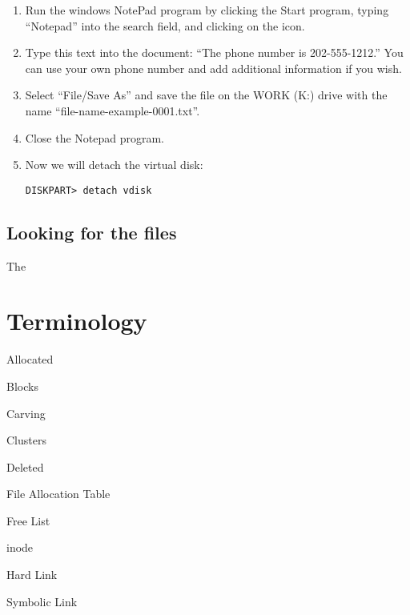 \begin{enumerate}
At this point we have a 16MB virtual disk attached to the computer as
drive K:. The drive's contents are stored in the file |C:\disk1.vhd|.

Lastly, we want to put a file on this disk. For test purposes we are
going to use a small file with a distinctive file name and file
contents.

\item Run the windows NotePad program by clicking the Start program,
typing ``Notepad'' into the search field, and clicking on the icon.

\item Type this text into the document:  ``The phone number is
202-555-1212.'' You can use your own phone number and add additional
information if you wish.

\item Select ``File/Save As'' and save the file on the WORK (K:) drive
with the name ``file-name-example-0001.txt''. 

\item Close the Notepad program.

\item Now we will detach the virtual disk:

\begin{Verbatim}
DISKPART> detach vdisk
\end{Verbatim}

\end{enumerate}

\subsection{Looking for the files}
The 

\section{Terminology}


Allocated

Blocks

Carving

Clusters

Deleted

File Allocation Table

Free List

inode

Hard Link

Symbolic Link

